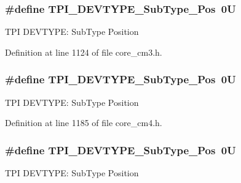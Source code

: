 \subsubsection[{\texorpdfstring{T\+P\+I\+\_\+\+D\+E\+V\+T\+Y\+P\+E\+\_\+\+Sub\+Type\+\_\+\+Pos}{TPI_DEVTYPE_SubType_Pos}}]{\setlength{\rightskip}{0pt plus 5cm}\#define T\+P\+I\+\_\+\+D\+E\+V\+T\+Y\+P\+E\+\_\+\+Sub\+Type\+\_\+\+Pos~0U}\hypertarget{group___c_m_s_i_s___t_p_i_ga0c799ff892af5eb3162d152abc00af7a}{}\label{group___c_m_s_i_s___t_p_i_ga0c799ff892af5eb3162d152abc00af7a}
T\+PI D\+E\+V\+T\+Y\+PE\+: Sub\+Type Position 

Definition at line 1124 of file core\+\_\+cm3.\+h.

\subsubsection[{\texorpdfstring{T\+P\+I\+\_\+\+D\+E\+V\+T\+Y\+P\+E\+\_\+\+Sub\+Type\+\_\+\+Pos}{TPI_DEVTYPE_SubType_Pos}}]{\setlength{\rightskip}{0pt plus 5cm}\#define T\+P\+I\+\_\+\+D\+E\+V\+T\+Y\+P\+E\+\_\+\+Sub\+Type\+\_\+\+Pos~0U}\hypertarget{group___c_m_s_i_s___t_p_i_ga0c799ff892af5eb3162d152abc00af7a}{}\label{group___c_m_s_i_s___t_p_i_ga0c799ff892af5eb3162d152abc00af7a}
T\+PI D\+E\+V\+T\+Y\+PE\+: Sub\+Type Position 

Definition at line 1185 of file core\+\_\+cm4.\+h.

\subsubsection[{\texorpdfstring{T\+P\+I\+\_\+\+D\+E\+V\+T\+Y\+P\+E\+\_\+\+Sub\+Type\+\_\+\+Pos}{TPI_DEVTYPE_SubType_Pos}}]{\setlength{\rightskip}{0pt plus 5cm}\#define T\+P\+I\+\_\+\+D\+E\+V\+T\+Y\+P\+E\+\_\+\+Sub\+Type\+\_\+\+Pos~0U}\hypertarget{group___c_m_s_i_s___t_p_i_ga0c799ff892af5eb3162d152abc00af7a}{}\label{group___c_m_s_i_s___t_p_i_ga0c799ff892af5eb3162d152abc00af7a}
T\+PI D\+E\+V\+T\+Y\+PE\+: Sub\+Type Position 

